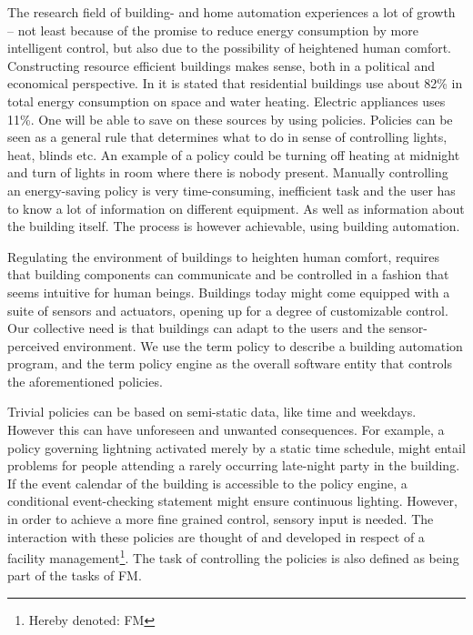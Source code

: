 The research field of building- and home automation experiences a lot of growth -- not least because of the promise to reduce energy consumption by more intelligent control, but also due to the possibility of heightened human comfort. Constructing resource efficient buildings makes sense, both in a political and economical perspective. In \cite{janssen2004towards} it is stated that residential buildings use about 82\% in total energy consumption on space and water heating. Electric appliances uses 11\%. One will be able to save on these sources by using policies. Policies can be seen as a general rule that determines what to do in sense of controlling lights, heat, blinds etc. An example of a policy could be turning off heating at midnight and turn of lights in room where there is nobody present. 
Manually controlling an energy-saving policy is very time-consuming, inefficient task and the user has to know a lot of information on different equipment. As well as information about the building itself. The process is however achievable,  using building automation. 

Regulating the environment of buildings to heighten human comfort, requires that building components can communicate and be controlled in a fashion that seems intuitive for human beings. Buildings today might come equipped with a suite of sensors and actuators, opening up for a degree of customizable control. Our collective need is that buildings can adapt to the users and the sensor-perceived environment. We use the term policy to describe a building automation program, and the term policy engine as the overall software entity that controls the aforementioned policies.

Trivial policies can be based on semi-static data, like time and weekdays. However this can have unforeseen and unwanted consequences. For example, a policy governing lightning activated merely by a static time schedule, might entail problems for people attending a rarely occurring late-night party in the building. If the event calendar of the building is accessible to the policy engine, a conditional event-checking statement might ensure continuous lighting. However, in order to achieve a more fine grained control, sensory input is needed. The interaction with these policies are thought of and developed in respect of a facility management\footnote{Hereby denoted: FM}. The task of controlling the policies is also defined as being part of the tasks of FM.

